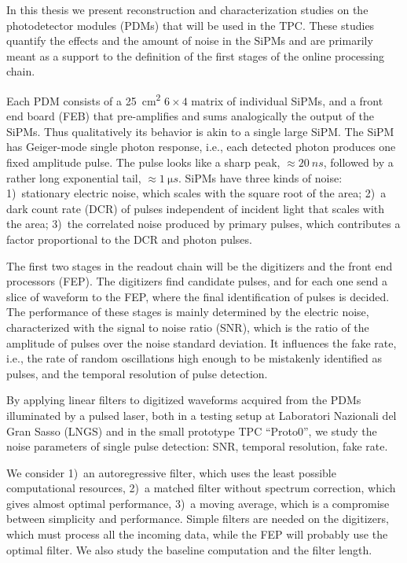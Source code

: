 In this thesis we present reconstruction and characterization studies on the
photodetector modules (PDMs) that will be used in the TPC. These studies
quantify the effects and the amount of noise in the SiPMs and are primarily
meant as a support to the definition of the first stages of the online
processing chain.

Each PDM consists of a \SI{25}{cm^2} $6\times 4$ matrix of individual SiPMs,
and a front end board (FEB) that pre-amplifies and sums analogically the output
of the SiPMs. Thus qualitatively its behavior is akin to a single large SiPM.
The SiPM has Geiger-mode single photon response, i.e., each detected photon
produces one fixed amplitude pulse. The pulse looks like a sharp peak,
$\approx\SI{20}{ns}$, followed by a rather long exponential tail,
$\approx\SI{1}{\micro s}$. SiPMs have three kinds of noise: 1)~stationary
electric noise, which scales with the square root of the area; 2)~a dark count
rate (DCR) of pulses independent of incident light that scales with the area;
3)~the correlated noise produced by primary pulses, which contributes a factor
proportional to the DCR and photon pulses.

The first two stages in the readout chain will be the digitizers and the front
end processors (FEP). The digitizers find candidate pulses, and for each one
send a slice of waveform to the FEP, where the final identification of pulses
is decided. The performance of these stages is mainly determined by the
electric noise, characterized with the signal to noise ratio (SNR), which is
the ratio of the amplitude of pulses over the noise standard deviation. It
influences the fake rate, i.e., the rate of random oscillations high enough to
be mistakenly identified as pulses, and the temporal resolution of pulse
detection.

By applying linear filters to digitized waveforms acquired from the PDMs
illuminated by a pulsed laser, both in a testing setup at Laboratori Nazionali
del Gran Sasso (LNGS) and in the small prototype TPC ``Proto0'', we study the
noise parameters of single pulse detection: SNR, temporal resolution, fake rate.

We consider 1)~an autoregressive filter, which uses the least possible
computational resources, 2)~a matched filter without spectrum correction, which
gives almost optimal performance, 3)~a moving average, which is a compromise
between simplicity and performance. Simple filters are needed on the
digitizers, which must process all the incoming data, while the FEP will
probably use the optimal filter. We also study the baseline computation and the
filter length.

